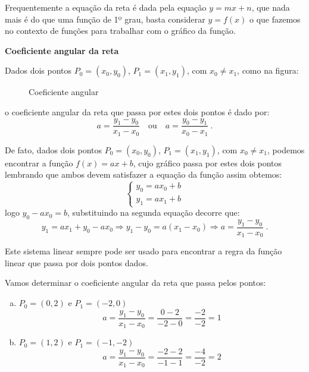 \begin{itemize}
 Frequentemente a equação da reta é dada pela equação $y=mx+n$, que nada mais é do que uma função de 1º grau, basta considerar $y=f(x)$ o que fazemos no contexto de funções para trabalhar com o gráfico da função.

 \textbf{Coeficiente angular da reta}

  Dados dois pontos $P_0=(x_0, y_0)$, $P_1=(x_1, y_1)$, com $x_0 \neq x_1$, como na figura:

 \begin{figure}[H]
 \centering
    \caption{Coeficiente angular}
  \end{figure}

  o coeficiente angular da reta que passa por estes dois pontos é dado por:
  \[a= \frac{y_1 - y_0}{x_1 - x_0} \ \ \ \text{ ou } \ \ \ a= \frac{y_0 - y_1}{x_0 - x_1} \ .\]

  De fato, dados dois pontos $P_0=(x_0, y_0)$, $P_1=(x_1, y_1)$, com $x_0 \neq x_1$, podemos encontrar a função $f(x)= ax+b$, cujo gráfico passa por estes dois pontos lembrando que ambos devem satisfazer a equação da função assim obtemos:
  \[ \begin{cases}
   y_0= ax_0 + b \\
   y_1= ax_1 + b
  \end{cases} \]
  logo $y_0 - ax_0= b$, substituindo na segunda equação decorre que:
  \[y_1= ax_1 + y_0 - ax_0 \Rightarrow y_1 - y_0= a(x_1 - x_0) \Rightarrow a= \frac{y_1 - y_0}{x_1 - x_0} \ . \]

  Este sistema linear sempre pode ser usado para encontrar a regra da função linear que passa por dois pontos dados.


  \begin{exem}
  Vamos determinar o coeficiente angular da reta que passa pelos pontos:
   \begin{enumerate}[a)]
    \item $P_0=(0,2)$ e $P_1=(-2,0)$
    \[a= \frac{y_1 - y_0}{x_1 - x_0}= \frac{0 - 2}{-2 - 0}= \frac{-2}{-2}= 1\]
    \item $P_0=(1,2)$ e $P_1=(-1,-2)$
    \[a= \frac{y_1 - y_0}{x_1 - x_0}= \frac{-2 - 2}{-1 - 1}= \frac{-4}{-2}= 2\]
   \end{enumerate}


\end{exem}
\end{itemize}
